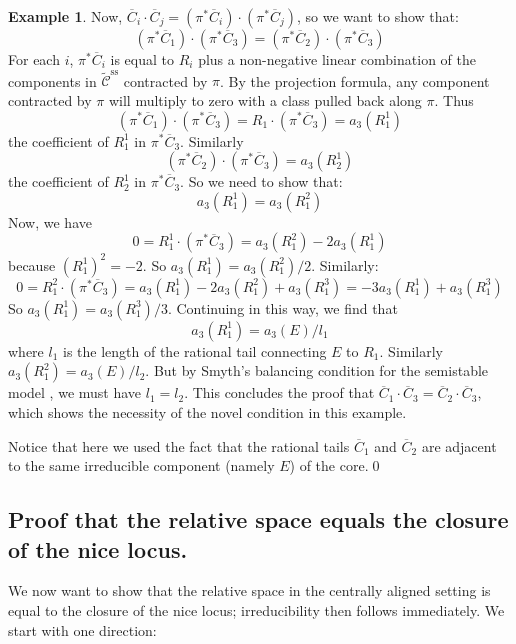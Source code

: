 \documentclass[11pt]{amsart}
\newcommand{\ovt}[1]{\widetilde{\mathcal{#1}}}
\newcommand{\ov}[1]{\overline{#1}}
\theoremstyle{definition}
\theoremstyle{definition}
\newtheorem{example}[thm]{Example}
\begin{document}
\begin{example}
Now, $\ov{C}_i \cdot \ov{C}_j = (\pi^* \ov{C}_i)\cdot(\pi^* \ov{C}_j)$, so we want to show that:
\begin{equation*} (\pi^* \ov{C}_1)\cdot(\pi^*\ov{C}_3) = (\pi^* \ov{C}_2)\cdot(\pi^*\ov{C}_3) \end{equation*}
For each $i$, $\pi^*\ov{C}_i$ is equal to $R_i$ plus a non-negative linear combination of the components in $\ovt{C}^{\operatorname{ss}}$ contracted by $\pi$. By the projection formula, any component contracted by $\pi$ will multiply to zero with a class pulled back along $\pi$. Thus
\begin{equation*} (\pi^* \ov{C}_1)\cdot(\pi^*\ov{C}_3) = R_1 \cdot (\pi^*\ov{C}_3) = a_3(R_1^1) \end{equation*}
the coefficient of $R_1^1$ in $\pi^* \ov{C}_3$. Similarly
\begin{equation*} (\pi^* \ov{C}_2) \cdot (\pi^* \ov{C}_3) = a_3(R_2^1) \end{equation*}
the coefficient of $R_2^1$ in $\pi^* \ov{C}_3$. So we need to show that:
\begin{equation*} a_3(R_1^1) = a_3(R_1^2) \end{equation*}
Now, we have
\begin{equation*} 0 = R_1^1 \cdot (\pi^* \ov{C}_3) = a_3(R_1^2) - 2a_3(R_1^1) \end{equation*}
because $(R_1^1)^2=-2$. So $a_3(R_1^1) = a_3(R_1^2)/2$. Similarly:
\begin{equation*} 0 = R_1^2 \cdot (\pi^*\ov{C}_3) = a_3(R_1^1) - 2a_3(R_1^2) + a_3(R_1^3) = -3a_3(R_1^1) + a_3(R_1^3) \end{equation*}
So $a_3(R_1^1) = a_3(R_1^3)/3$. Continuing in this way, we find that
\begin{equation*} a_3(R_1^1) = a_3(E)/l_1 \end{equation*}
where $l_1$ is the length of the rational tail connecting $E$ to $R_1$. Similarly $a_3(R_1^2) = a_3(E)/l_2$. But by Smyth's balancing condition for the semistable model \cite[Proposition 2.11]{SMY1}, we must have $l_1=l_2$. This concludes the proof that $\ov{C}_1 \cdot \ov{C}_3 = \ov{C}_2 \cdot \ov{C}_3$, which shows the necessity of the novel condition in this example.

Notice that here we used the fact that the rational tails $\ov{C}_1$ and $\ov{C}_2$ are adjacent to the same irreducible component (namely $E$) of the core.\qed
\end{example}

\subsection{Proof that the relative space equals the closure of the nice locus.}
We now want to show that the relative space in the centrally aligned setting is equal to the closure of the nice locus; irreducibility then follows immediately. We start with one direction:
\end{document}

